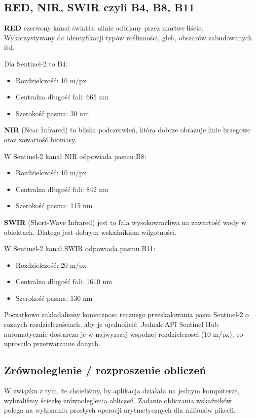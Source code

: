 \documentclass[12pt,a4paper]{article}
\begin{document}
\subsection{RED, NIR, SWIR czyli B4, B8, B11}

\textbf{RED} czerwony kanał światła, silnie odbijany przez martwe liście. Wykorzystywany do identyfikacji typów roślinności, gleb, obszarów zabudowanych itd.

Dla Sentinel-2 to B4: \cite{sentinel2_band_B4}
\begin{itemize}
    \item Rozdzielczość: 10 m/px
    \item Centralna długość fali: 665 nm
    \item Szerokość pasma: 30 nm
\end{itemize}

\textbf{NIR} (Near Infrared) to bliska podczerwień, która dobrze obrazuje linie brzegowe oraz zawartość biomasy.

W Sentinel-2 kanał NIR odpowiada pasmu B8: \cite{sentinel2_band_B8}
\begin{itemize}
    \item Rozdzielczość: 10 m/px
    \item Centralna długość fali: 842 nm
    \item Szerokość pasma: 115 nm
\end{itemize}

\textbf{SWIR} (Short-Wave Infrared) jest to fala wysokowrażliwa na zawartość wody w obiektach. Dlatego jest dobrym wskaźnikiem wilgotności.

W Sentinel-2 kanał SWIR odpowiada pasmu B11: \cite{sentinel2_band_B11}
\begin{itemize}
    \item Rozdzielczość: 20 m/px
    \item Centralna długość fali: 1610 nm
    \item Szerokość pasma: 130 nm
\end{itemize}

Poczatkowo zakladalismy koniecznosc recznego przeskalowania pasm Sentinel-2 o roznych rozdzielczościach, aby je ujednolicić. Jednak API Sentinel Hub automatycznie dostarcza je w najwyzszej wspolnej rozdzielczosci (10 m/px), co uproscilo przetwarzanie danych.

\subsection{Zrównoleglenie / rozproszenie obliczeń}
W związku z tym, że chcieliśmy, by aplikacja działała na jednym komputerze, wybraliśmy ścieżkę zrównoleglenia obliczeń. Zadanie obliczania wskaźników polega na wykonaniu prostych operacji arytmetycznych dla milionów pikseli.
\end{document}
